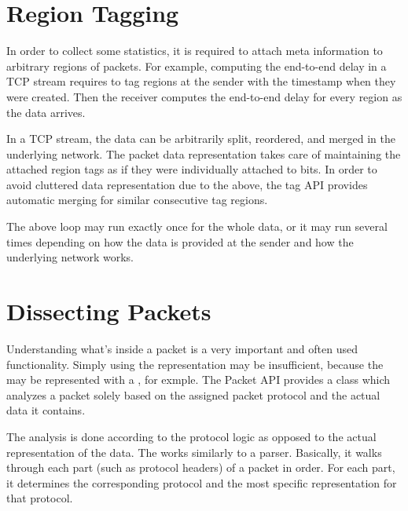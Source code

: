
\section{Region Tagging}

In order to collect some statistics, it is required to attach meta information
to arbitrary regions of packets. For example, computing the end-to-end delay in
a TCP stream requires to tag regions at the sender with the timestamp when they
were created. Then the receiver computes the end-to-end delay for every region
as the data arrives.


In a TCP stream, the data can be arbitrarily split, reordered, and merged in the
underlying network. The packet data representation takes care of maintaining the
attached region tags as if they were individually attached to bits. In order to
avoid cluttered data representation due to the above, the tag API provides
automatic merging for similar consecutive tag regions.


The above loop may run exactly once for the whole data, or it may run several
times depending on how the data is provided at the sender and how the underlying
network works.

\section{Dissecting Packets}

Understanding what's inside a packet is a very important and often used
functionality. Simply using the representation may be insufficient, because the
 may be represented with a , for exmple.
The Packet API provides a  class which analyzes a
packet solely based on the assigned packet protocol and the actual data it
contains.

The analysis is done according to the protocol logic as opposed to the actual
representation of the data. The  works similarly to a
parser. Basically, it walks through each part (such as protocol headers) of a
packet in order. For each part, it determines the corresponding protocol and the
most specific representation for that protocol.

